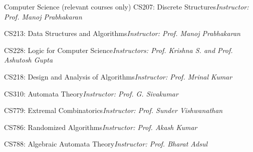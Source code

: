 \begin{rubric}{Computer Science (relevant courses only)}
\entry*[AA] CS207: Discrete Structures\hfill\emph{Instructor: Prof. Manoj Prabhakaran}


\entry*[AB] CS213: Data Structures and Algorithms\hfill\emph{Instructor: Prof. Manoj Prabhakaran}


\entry*[AA] CS228: Logic for Computer Science\hfill\emph{Instructors: Prof. Krishna S. and Prof. Ashutosh Gupta}


\entry*[AA] CS218: Design and Analysis of Algorithms\hfill\emph{Instructor: Prof. Mrinal Kumar}


\entry*[AA] CS310: Automata Theory\hfill\emph{Instructor: Prof. G. Sivakumar}


\entry*[AA] CS779: Extremal Combinatorics\hfill\emph{Instructor: Prof. Sunder Vishwanathan}


\entry*[AB] CS786: Randomized Algorithms\hfill\emph{Instructor: Prof. Akash Kumar}


\entry*[BB] CS788: Algebraic Automata Theory\hfill\emph{Instructor: Prof. Bharat Adsul}
\end{rubric}